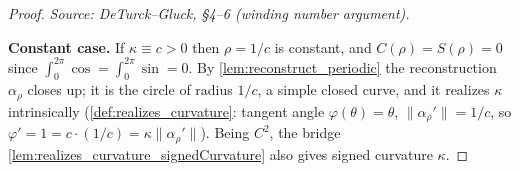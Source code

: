 \begin{proof}
  \leanok
  \textit{Source: DeTurck--Gluck, §4–6 (winding number argument).}

  \textbf{Constant case.} If $\kappa \equiv c > 0$ then $\rho = 1/c$ is constant,
  and $C(\rho) = S(\rho) = 0$ since $\int_0^{2\pi}\cos = \int_0^{2\pi}\sin = 0$.
  By \cref{lem:reconstruct_periodic} the reconstruction $\alpha_\rho$ closes up; it is the
  circle of radius $1/c$, a simple closed curve, and it realizes $\kappa$
  intrinsically (\cref{def:realizes_curvature}: tangent angle $\varphi(\theta) =
  \theta$, $\lVert\alpha_\rho'\rVert = 1/c$, so $\varphi' = 1 = c \cdot (1/c) =
  \kappa\lVert\alpha_\rho'\rVert$). Being $C^2$, the bridge
  \cref{lem:realizes_curvature_signedCurvature} also gives signed curvature
  $\kappa$.


\end{proof}
